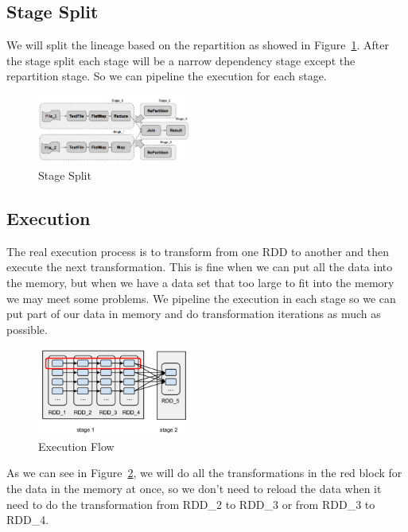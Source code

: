 \subsection{Stage Split} %
\label{sub:stage_split}
We will split the lineage based on the repartition as showed in Figure~\ref{fig:stage_split}. After the stage split each stage will be a narrow dependency stage except the repartition stage. So we can pipeline the execution for each stage.
\begin{figure}[ht]
    \centering
    \includegraphics[width=0.45\textwidth]{stage_split.png}
    \caption{Stage Split}\label{fig:stage_split}
\end{figure}

\subsection{Execution} %
\label{sub:execution}
The real execution process is to transform from one RDD to another and then execute the next transformation. This is fine when we can put all the data into the memory, but when we have a data set that too large to fit into the memory we may meet some problems. We pipeline the execution in each stage so we can put part of our data in memory and do transformation iterations as much as possible.

\begin{figure}[ht]
    \centering
    \includegraphics[width=0.45\textwidth]{execution_flow.png}
    \caption{Execution Flow}\label{fig:execution_flow}
\end{figure}

As we can see in Figure~\ref{fig:execution_flow}, we will do all the transformations in the red block for the data in the memory at once, so we don’t need to reload the data when it need to do the transformation from RDD\_2 to RDD\_3 or from RDD\_3 to RDD\_4.

